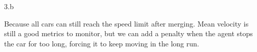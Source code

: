 \LARGE
3.b
\normalsize

\begin{answer}
  Because all cars can still reach the speed limit after merging. Mean velocity is still a good metrics to monitor, but we can add a penalty when the agent stops the car for too long, forcing it to keep moving in the long run.
\end{answer}
\clearpage



